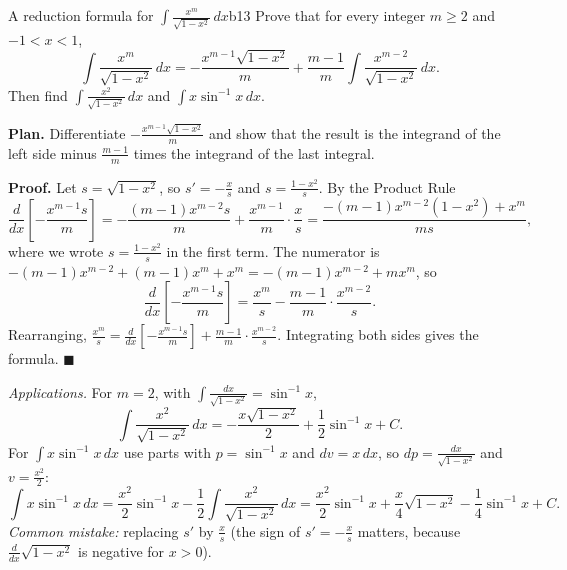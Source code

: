 \documentclass[11pt]{article}
\begin{document}
\begin{exmp}{A reduction formula for $\int\frac{x^m}{\sqrt{1-x^2}}\,dx$}{b13}
Prove that for every integer $m\ge2$ and $-1<x<1$,
\[\int\frac{x^m}{\sqrt{1-x^2}}\,dx=-\frac{x^{m-1}\sqrt{1-x^2}}m+\frac{m-1}m\int\frac{x^{m-2}}{\sqrt{1-x^2}}\,dx .\]
Then find $\displaystyle\int\frac{x^2}{\sqrt{1-x^2}}\,dx$ and $\displaystyle\int x\sin^{-1}x\,dx$.

\textbf{Plan.} Differentiate $-\frac{x^{m-1}\sqrt{1-x^2}}m$ and show that the result is the integrand of the left side minus $\frac{m-1}m$ times the integrand of the last integral.

\textbf{Proof.} Let $s=\sqrt{1-x^2}$, so $s'=-\frac xs$ and $s=\frac{1-x^2}s$. By the Product Rule
\[\frac d{dx}\left[-\frac{x^{m-1}s}m\right]=-\frac{(m-1)x^{m-2}s}m+\frac{x^{m-1}}m\cdot\frac xs=\frac{-(m-1)x^{m-2}(1-x^2)+x^m}{ms},\]
where we wrote $s=\frac{1-x^2}s$ in the first term. The numerator is $-(m-1)x^{m-2}+(m-1)x^m+x^m=-(m-1)x^{m-2}+mx^m$, so
\[\frac d{dx}\left[-\frac{x^{m-1}s}m\right]=\frac{x^m}s-\frac{m-1}m\cdot\frac{x^{m-2}}s .\]
Rearranging, $\frac{x^m}s=\frac d{dx}\left[-\frac{x^{m-1}s}m\right]+\frac{m-1}m\cdot\frac{x^{m-2}}s$. Integrating both sides gives the formula. $\blacksquare$

\emph{Applications.} For $m=2$, with $\int\frac{dx}{\sqrt{1-x^2}}=\sin^{-1}x$,
\[\int\frac{x^2}{\sqrt{1-x^2}}\,dx=-\frac{x\sqrt{1-x^2}}2+\frac12\sin^{-1}x+C .\]
For $\int x\sin^{-1}x\,dx$ use parts with $p=\sin^{-1}x$ and $dv=x\,dx$, so $dp=\frac{dx}{\sqrt{1-x^2}}$ and $v=\frac{x^2}2$:
\[\int x\sin^{-1}x\,dx=\frac{x^2}2\sin^{-1}x-\frac12\int\frac{x^2}{\sqrt{1-x^2}}\,dx=\frac{x^2}2\sin^{-1}x+\frac x4\sqrt{1-x^2}-\frac14\sin^{-1}x+C .\]
\emph{Common mistake:} replacing $s'$ by $\frac xs$ (the sign of $s'=-\frac xs$ matters, because $\frac{d}{dx}\sqrt{1-x^2}$ is negative for $x>0$).
\end{exmp}
\end{document}
